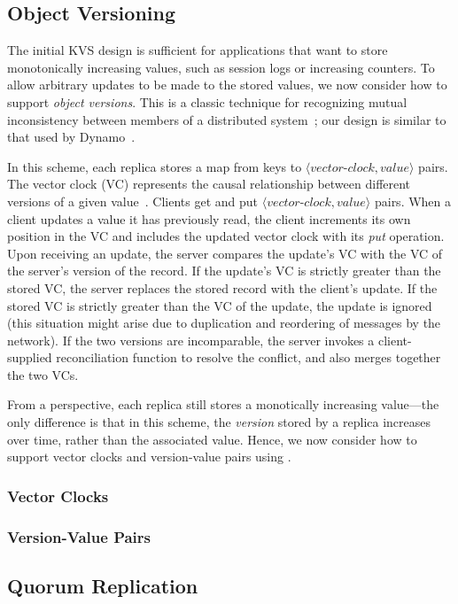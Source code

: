 \subsection{Object Versioning}
\label{sec:kvs-versions}

The initial KVS design is sufficient for applications that want to store
monotonically increasing values, such as session logs or increasing counters. To
allow arbitrary updates to be made to the stored values, we now consider how to
support \emph{object versions}. This is a classic technique for recognizing
mutual inconsistency between members of a distributed system~\cite{Parker1983};
our design is similar to that used by Dynamo~\cite{DeCandia2007}.

In this scheme, each replica stores a map from keys to
$\langle\textit{vector-clock},\textit{value}\rangle$ pairs. The vector clock
(VC) represents the causal relationship between different versions of a given
value~\cite{Fidge1988,Mattern1989}. Clients get and put
$\langle\textit{vector-clock},\textit{value}\rangle$ pairs. When a client
updates a value it has previously read, the client increments its own position
in the VC and includes the updated vector clock with its \emph{put}
operation. Upon receiving an update, the server compares the update's VC with
the VC of the server's version of the record. If the update's VC is strictly
greater than the stored VC, the server replaces the stored record with the
client's update. If the stored VC is strictly greater than the VC of the update,
the update is ignored (this situation might arise due to duplication and
reordering of messages by the network). If the two versions are incomparable,
the server invokes a client-supplied reconciliation function to resolve the
conflict, and also merges together the two VCs.

From a \lang perspective, each replica still stores a monotically increasing
value---the only difference is that in this scheme, the \emph{version} stored by
a replica increases over time, rather than the associated value. Hence, we now
consider how to support vector clocks and version-value pairs using \lang.

\subsubsection{Vector Clocks}

\subsubsection{Version-Value Pairs}

\subsection{Quorum Replication}
